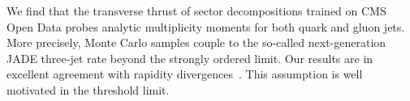 We find that the transverse thrust of sector decompositions trained on
CMS Open Data probes analytic multiplicity moments for both quark and
gluon jets. More precisely, Monte Carlo samples couple to the so-called
next-generation JADE three-jet rate beyond the strongly ordered limit.
Our results are in excellent agreement with rapidity
divergences~\cite{TPC:0928-Higgs-Couplings-Revisited-September-29-2026}.
This assumption is well motivated in the threshold limit.

